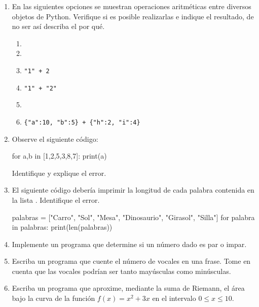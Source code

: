 \begin{enumerate}


\item En las siguientes opciones se muestran operaciones aritméticas entre diversos 
objetos de Python. Verifique si es posible realizarlas e indique el resultado, 
de no ser así describa el por qué.

\begin{enumerate}
    \item {}
    \item {}
    \item \verb|"1" + 2|
    \item \verb|"1" + "2"|
    \item \code{[1,2,3] + [10,20]}
    \item \verb|{"a":10, "b":5} + {"h":2, "i":4}|
\end{enumerate}

\item Observe el siguiente código:

\begin{python}
for a,b in [1,2,5,3,8,7]:
    print(a)
\end{python}

Identifique y explique el error.

\item El siguiente código debería imprimir la longitud de cada palabra contenida en la 
lista . Identifique el error.

\begin{python}
palabras = ["Carro", "Sol", "Mesa", "Dinosaurio", "Girasol", "Silla"]
for palabra in palabras:
    print(len(palabras))
\end{python}

\item Implemente un programa que determine si un número dado es par o impar.

\item Escriba un programa que cuente el número de vocales en una frase. Tome en cuenta que las vocales 
podrían ser tanto mayúsculas como minúsculas.

\item Escriba un programa que aproxime, mediante la suma de Riemann, el área bajo la curva de la función 
$ f(x) = x^2 + 3x $ en el intervalo $ 0 \leq x \leq 10 $. 

\end{enumerate}